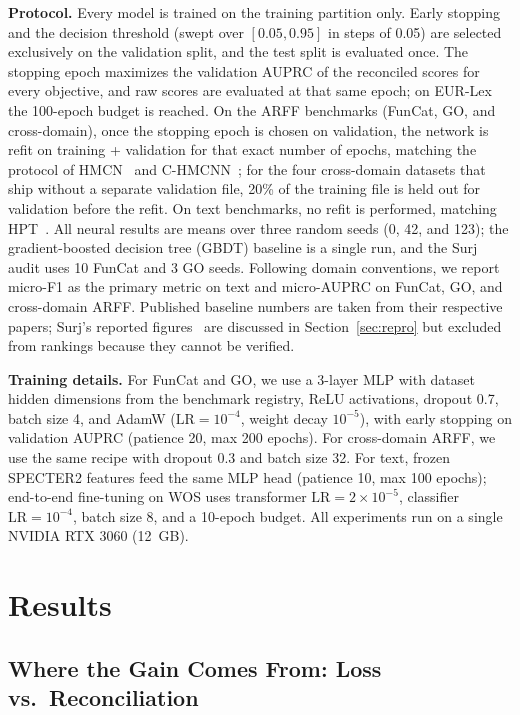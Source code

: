 \documentclass[conference]{IEEEtran}
\begin{document}
\textbf{Protocol.} Every model is trained on the training partition only. Early
stopping and the decision threshold (swept over $[0.05, 0.95]$ in steps of
0.05) are selected exclusively on the validation split, and the test split is
evaluated once. The stopping epoch maximizes the validation AUPRC of the
reconciled scores for every objective, and raw scores are evaluated at that
same epoch; on EUR-Lex the 100-epoch budget is reached. On the ARFF benchmarks (FunCat, GO, and cross-domain), once the
stopping epoch is chosen on validation, the network is refit on training +
validation for that exact number of epochs, matching the protocol of
HMCN~\cite{weihs2018hmc} and C-HMCNN~\cite{chmcnn}; for the four cross-domain
datasets that ship without a separate validation file, 20\% of the training
file is held out for validation before the refit. On text benchmarks, no refit
is performed, matching HPT~\cite{hpt}. All neural results are means over
three random seeds (0, 42, and 123); the gradient-boosted decision tree (GBDT)
baseline is a single run, and the Surj audit uses 10 FunCat and 3
GO seeds. Following domain conventions, we report
micro-F1 as the primary metric on text and micro-AUPRC on FunCat, GO, and
cross-domain ARFF. Published baseline numbers are taken from their respective
papers; Surj's reported figures~\cite{www2022ontology} are discussed in
Section~\ref{sec:repro} but excluded from rankings because they cannot be
verified.

\textbf{Training details.} For FunCat and GO, we use a 3-layer MLP with dataset
hidden dimensions from the benchmark registry, ReLU activations, dropout 0.7,
batch size 4, and AdamW ($\text{LR}=10^{-4}$, weight decay $10^{-5}$), with
early stopping on validation AUPRC (patience 20, max 200 epochs). For
cross-domain ARFF, we use the same recipe with dropout 0.3 and batch size 32.
For text, frozen SPECTER2 features feed the same MLP head (patience 10, max 100
epochs); end-to-end fine-tuning on WOS uses transformer $\text{LR}=2\times
10^{-5}$, classifier $\text{LR}=10^{-4}$, batch size 8, and a 10-epoch budget.
All experiments run on a single NVIDIA RTX 3060 (12~GB).

\section{Results}
\label{sec:results}

\subsection{Where the Gain Comes From: Loss vs.\ Reconciliation}
\label{sec:decomp}
\end{document}
